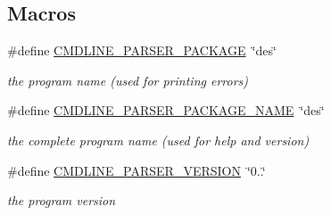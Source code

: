 \subsection*{Macros}
\begin{DoxyCompactItemize}
\item 
\mbox{\label{aes-getopt_8h_aeb847973552c32bcbe5f14973a0a8a32}} 
\#define \hyperlink{aes-getopt_8h_aeb847973552c32bcbe5f14973a0a8a32}{C\+M\+D\+L\+I\+N\+E\+\_\+\+P\+A\+R\+S\+E\+R\+\_\+\+P\+A\+C\+K\+A\+GE}~\char`\"{}des\char`\"{}
\begin{DoxyCompactList}\small\item\em the program name (used for printing errors) \end{DoxyCompactList}\item 
\mbox{\label{aes-getopt_8h_ae2f94765d0d8758ddf6b326a4806d6ff}} 
\#define \hyperlink{aes-getopt_8h_ae2f94765d0d8758ddf6b326a4806d6ff}{C\+M\+D\+L\+I\+N\+E\+\_\+\+P\+A\+R\+S\+E\+R\+\_\+\+P\+A\+C\+K\+A\+G\+E\+\_\+\+N\+A\+ME}~\char`\"{}des\char`\"{}
\begin{DoxyCompactList}\small\item\em the complete program name (used for help and version) \end{DoxyCompactList}\item 
\mbox{\label{aes-getopt_8h_a1eeca7dc254bf6867ba9635f45771471}} 
\#define \hyperlink{aes-getopt_8h_a1eeca7dc254bf6867ba9635f45771471}{C\+M\+D\+L\+I\+N\+E\+\_\+\+P\+A\+R\+S\+E\+R\+\_\+\+V\+E\+R\+S\+I\+ON}~\char`\"{}0..\char`\"{}
\begin{DoxyCompactList}\small\item\em the program version \end{DoxyCompactList}\end{DoxyCompactItemize}
